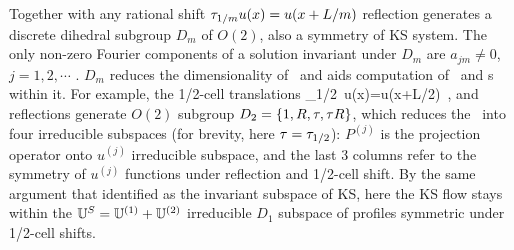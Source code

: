 Together with any rational shift $ \tau_{1/m}u(x)=u(x+L/m)$
reflection generates a discrete dihedral subgroup $D_m$ of $O(2)$, also
a symmetry of KS system. The only non-zero Fourier components of a
solution invariant under $D_m$ are $a_{jm} \neq 0$, $j =1,2,\cdots$ .
$D_m$ reduces the dimensionality of \statesp\ and aids computation of
\eqva\ and \po s within it. For example, the 1/2-cell translations \beq
    \Shift_{1/2}\, u(x)=u(x+L/2)
\,,
and reflections generate $O(2)$
subgroup $D_2 = \{1, R,\tau,\tau R\}$,
which
reduces the \statesp\ into four irreducible subspaces
(for brevity, here $\tau = \tau_{1/2}$):
$P^{(j)}$ is the projection operator onto
$u^{(j)}$ irreducible subspace, and the last 3 columns
refer to the symmetry of
$u^{(j)}$ functions under reflection and
1/2-cell shift.
By the same argument that identified  as
the invariant subspace of KS, here the KS flow
stays within the
 $\mathbb{U}^S =  \mathbb{U}^{(1)}+ \mathbb{U}^{(2)}$
irreducible $D_1$ subspace of
profiles symmetric under 1/2-cell shifts.

